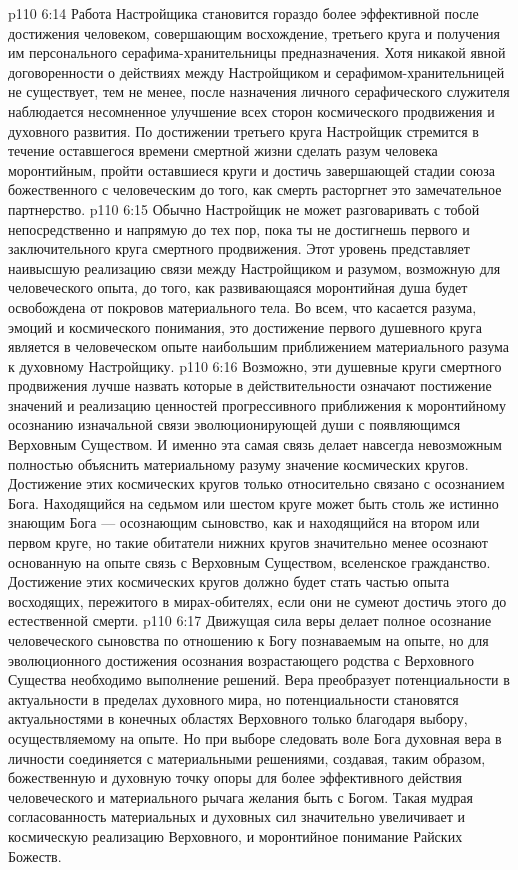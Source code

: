 \vs p110 6:14 \pc {} Работа Настройщика становится гораздо более эффективной после достижения человеком, совершающим восхождение, третьего круга и получения им персонального серафима\hyp{}хранительницы предназначения. Хотя никакой явной договоренности о действиях между Настройщиком и серафимом\hyp{}хранительницей не существует, тем не менее, после назначения личного серафического служителя наблюдается несомненное улучшение всех сторон космического продвижения и духовного развития. По достижении третьего круга Настройщик стремится в течение оставшегося времени смертной жизни сделать разум человека моронтийным, пройти оставшиеся круги и достичь завершающей стадии союза божественного с человеческим до того, как смерть расторгнет это замечательное партнерство.
\vs p110 6:15 \pc {} Обычно Настройщик не может разговаривать с тобой непосредственно и напрямую до тех пор, пока ты не достигнешь первого и заключительного круга смертного продвижения. Этот уровень представляет наивысшую реализацию связи между Настройщиком и разумом, возможную для человеческого опыта, до того, как развивающаяся моронтийная душа будет освобождена от покровов материального тела. Во всем, что касается разума, эмоций и космического понимания, это достижение первого душевного круга является в человеческом опыте наибольшим приближением материального разума к духовному Настройщику.
\vs p110 6:16 \pc Возможно, эти душевные круги смертного продвижения лучше назвать  которые в действительности означают постижение значений и реализацию ценностей прогрессивного приближения к моронтийному осознанию изначальной связи эволюционирующей души с появляющимся Верховным Существом. И именно эта самая связь делает навсегда невозможным полностью объяснить материальному разуму значение космических кругов. Достижение этих космических кругов только относительно связано с осознанием Бога. Находящийся на седьмом или шестом круге может быть столь же истинно знающим Бога --- осознающим сыновство, как и находящийся на втором или первом круге, но такие обитатели нижних кругов значительно менее осознают основанную на опыте связь с Верховным Существом, вселенское гражданство. Достижение этих космических кругов должно будет стать частью опыта восходящих, пережитого в мирах\hyp{}обителях, если они не сумеют достичь этого до естественной смерти.
\vs p110 6:17 Движущая сила веры делает полное осознание человеческого сыновства по отношению к Богу познаваемым на опыте, но для эволюционного достижения осознания возрастающего родства с  Верховного Существа необходимо  выполнение решений. Вера преобразует потенциальности в актуальности в пределах духовного мира, но потенциальности становятся актуальностями в конечных областях Верховного только благодаря выбору, осуществляемому на опыте. Но при выборе следовать воле Бога духовная вера в личности соединяется с материальными решениями, создавая, таким образом, божественную и духовную точку опоры для более эффективного действия человеческого и материального рычага желания быть с Богом. Такая мудрая согласованность материальных и духовных сил значительно увеличивает и космическую реализацию Верховного, и моронтийное понимание Райских Божеств.
